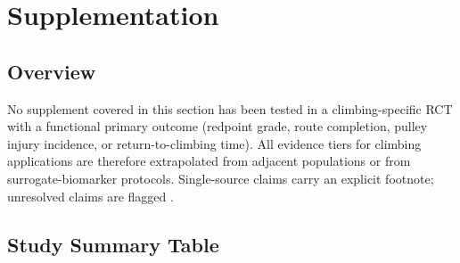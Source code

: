 \section{Supplementation}
\label{sec:supplements}

\subsection*{Overview}

No supplement covered in this section has been tested in a climbing-specific RCT with a functional primary outcome (redpoint grade, route completion, pulley injury incidence, or return-to-climbing time). All evidence tiers for climbing applications are therefore extrapolated from adjacent populations or from surrogate-biomarker protocols. Single-source claims carry an explicit footnote; unresolved claims are flagged \toverify.

\subsection{Study Summary Table}
\label{subsec:supptable}

